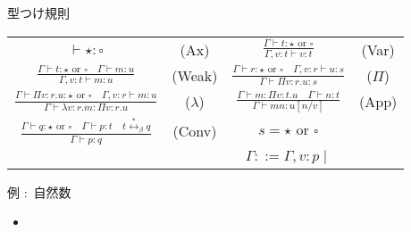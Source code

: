 \documentclass[18pt]{beamer}
\begin{document}
\begin{frame}[fragile]{型つけ規則}
\begin{tabular}{cccc}
 $\vdash {\star} {\colon} {\square}$ & (Ax) & $\frac{\Gamma \vdash t {\colon} {\star} \text{ or } {\square}}{\Gamma, v \colon t \vdash v {\colon} t}$ & (Var) \\[30pt]
 $\frac{\Gamma \vdash t {\colon} {\star} \text{ or } \square \quad \Gamma \vdash m {\colon} u}{\Gamma, v \colon t \vdash m {\colon} u}$ & (Weak) & $\frac{\Gamma \vdash r {\colon} {\star} \text{ or } {\square} \quad \Gamma, v \colon r \vdash u {\colon} s}{\Gamma \vdash \Pi v \colon r. u {\colon} s}$ & ($\Pi$) \\[30pt]
 $\frac{\Gamma \vdash \Pi v \colon r. u {\colon} {\star} \text{ or } {\square} \quad \Gamma, v \colon r \vdash m : u}{\Gamma \vdash \lambda v \colon r. m {\colon} \Pi v \colon r. u}$ & ($\lambda$) & $\frac{\Gamma \vdash m : \Pi v \colon t. u \quad \Gamma \vdash n : t}{\Gamma \vdash m n {\colon} u[n/v]}$ & (App) \\[30pt]
 $\frac{\Gamma \vdash q {\colon} {\star} \text{ or } {\square} \quad \Gamma \vdash p {\colon} t \quad t \overset{*}{\leftrightarrow}_\beta q}{\Gamma \vdash p {\colon} q}$ & (Conv) & $s = {\star} \text{ or } {\square}$ & \\[30pt]
& & $\Gamma ::= \Gamma, v \colon p \mid$ & \\
\end{tabular}
\end{frame}

\begin{frame}{例 $\colon$ 自然数}
 \begin{itemize}
  \item 
 \end{itemize}
\end{frame}


\end{document}
